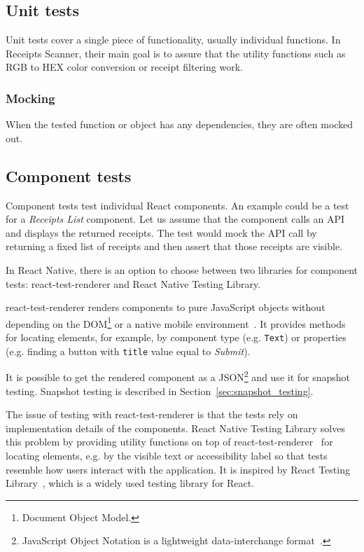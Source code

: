 \documentclass[
  digital, %
  table,   %
  oneside, %
  lof,     %
  lot,     %
]{fithesis3}
\begin{document}
\subsection{Unit tests}
Unit tests cover a single piece of functionality, usually individual functions. In Receipts Scanner, their main goal is to assure that the utility functions such as RGB to HEX color conversion or receipt filtering work.

\subsubsection{Mocking}
When the tested function or object has any dependencies, they are often mocked out.

\subsection{Component tests}
Component tests test individual React components. An example could be a test for a \textit{Receipts List} component. Let us assume that the component calls an API and displays the returned receipts. The test would mock the API call by returning a fixed list of receipts and then assert that those receipts are visible. 

In React Native, there is an option to choose between two libraries for component tests: react-test-renderer and React Native Testing Library. 

react-test-renderer renders components to pure JavaScript objects without depending on the DOM\footnote{Document Object Model.} or a native mobile environment~\cite{ReactTestRenderer}. It provides methods for locating elements, for example, by component type (e.g. \texttt{Text}) or properties (e.g. finding a button with \texttt{title} value equal to \textit{Submit}).

It is possible to get the rendered component as a JSON\footnote{JavaScript Object Notation is a lightweight data-interchange format~\cite{Ecma2017JSON}.} and use it for snapshot testing. Snapshot testing is described in Section~\ref{sec:snapshot_testing}.

The issue of testing with react-test-renderer is that the tests rely on implementation details of the components. React Native Testing Library solves this problem by providing utility functions on top of react-test-renderer~\cite{ReactNativeTestingLibrary} for locating elements, e.g. by the visible text or accessibility label so that tests resemble how users interact with the application. It is inspired by React Testing Library~\cite{ReactNativeTestingLibrary}, which is a widely used testing library for React.
\end{document}
